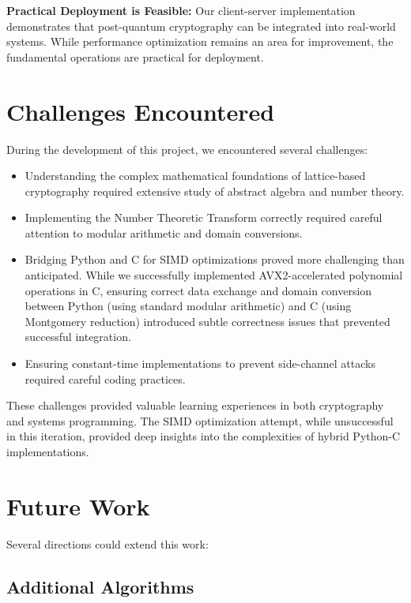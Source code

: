 \textbf{Practical Deployment is Feasible:} Our client-server implementation demonstrates that post-quantum cryptography can be integrated into real-world systems. While performance optimization remains an area for improvement, the fundamental operations are practical for deployment.

\section{Challenges Encountered}

During the development of this project, we encountered several challenges:

\begin{itemize}
\item Understanding the complex mathematical foundations of lattice-based cryptography required extensive study of abstract algebra and number theory.

\item Implementing the Number Theoretic Transform correctly required careful attention to modular arithmetic and domain conversions.

\item Bridging Python and C for SIMD optimizations proved more challenging than anticipated. While we successfully implemented AVX2-accelerated polynomial operations in C, ensuring correct data exchange and domain conversion between Python (using standard modular arithmetic) and C (using Montgomery reduction) introduced subtle correctness issues that prevented successful integration.

\item Ensuring constant-time implementations to prevent side-channel attacks required careful coding practices.
\end{itemize}

These challenges provided valuable learning experiences in both cryptography and systems programming. The SIMD optimization attempt, while unsuccessful in this iteration, provided deep insights into the complexities of hybrid Python-C implementations.

\section{Future Work}

Several directions could extend this work:

\subsection{Additional Algorithms}

